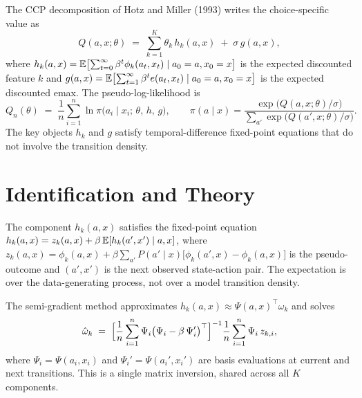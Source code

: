 \documentclass[11pt]{article}
\begin{document}
The CCP decomposition of Hotz and Miller (1993) writes the choice-specific value as
\begin{equation}
\label{eq:ccp_decomp}
Q(a,x;\theta) \;=\; \sum_{k=1}^K \theta_k\,h_k(a,x) \;+\; \sigma\,g(a,x),
\end{equation}
where $h_k(a,x) = \mathbb{E}\bigl[\sum_{t=0}^\infty \beta^t \phi_k(a_t, x_t) \mid a_0 = a, x_0 = x\bigr]$ is the expected discounted feature $k$ and $g(a,x) = \mathbb{E}\bigl[\sum_{t=1}^\infty \beta^t e(a_t, x_t) \mid a_0 = a, x_0 = x\bigr]$ is the expected discounted emax.
The pseudo-log-likelihood is
\begin{equation}
\label{eq:pseudo_ll}
Q_n(\theta) \;=\; \frac{1}{n}\sum_{i=1}^n \ln \pi\!\bigl(a_i \mid x_i;\, \theta,\, h,\, g\bigr), \qquad \pi(a \mid x) = \frac{\exp\bigl(Q(a,x;\theta)/\sigma\bigr)}{\sum_{a'}\exp\bigl(Q(a',x;\theta)/\sigma\bigr)}.
\end{equation}
The key objects $h_k$ and $g$ satisfy temporal-difference fixed-point equations that do not involve the transition density.

\section{Identification and Theory}

\begin{proposition}
The component $h_k(a,x)$ satisfies the fixed-point equation $h_k(a,x) = z_k(a,x) + \beta\,\mathbb{E}[h_k(a',x') \mid a,x]$, where $z_k(a,x) = \phi_k(a,x) + \beta\sum_{a'} P(a' \mid x)\bigl[\phi_k(a',x) - \phi_k(a,x)\bigr]$ is the pseudo-outcome and $(a',x')$ is the next observed state-action pair.
The expectation is over the data-generating process, not over a model transition density.
\end{proposition}

The semi-gradient method approximates $h_k(a,x) \approx \Psi(a,x)^\top \omega_k$ and solves
\begin{equation}
\label{eq:semigradient}
\hat\omega_k \;=\; \Bigl[\frac{1}{n}\sum_{i=1}^n \Psi_i\bigl(\Psi_i - \beta\,\Psi_i'\bigr)^\top\Bigr]^{-1} \frac{1}{n}\sum_{i=1}^n \Psi_i\, z_{k,i},
\end{equation}
where $\Psi_i = \Psi(a_i, x_i)$ and $\Psi_i' = \Psi(a_i', x_i')$ are basis evaluations at current and next transitions.
This is a single matrix inversion, shared across all $K$ components.
\end{document}
